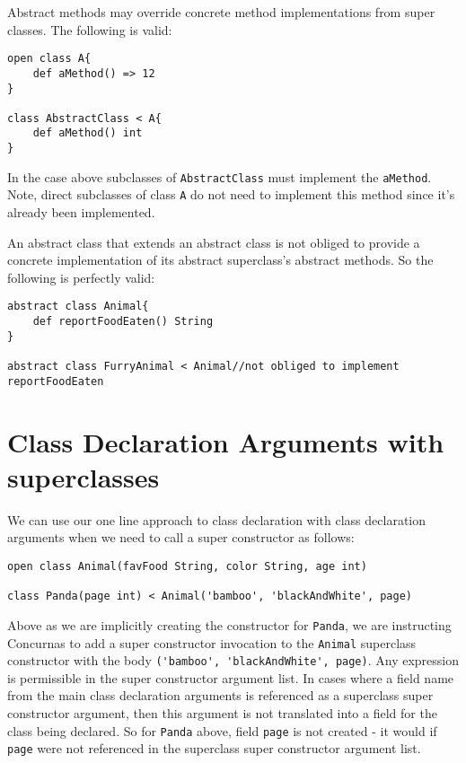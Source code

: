 \documentclass[conc-doc]{subfiles}
\begin{document}
Abstract methods may override concrete method implementations from super classes. The following is valid:

\begin{lstlisting}
open class A{
	def aMethod() => 12
}

class AbstractClass < A{
	def aMethod() int
}
\end{lstlisting}

In the case above subclasses of \lstinline{AbstractClass} must implement the \lstinline{aMethod}. Note, direct subclasses of class \lstinline{A} do not need to implement this method since it's already been implemented.

An abstract class that extends an abstract class is not obliged to provide a concrete implementation of its abstract superclass's abstract methods. So the following is perfectly valid:

\begin{lstlisting}
abstract class Animal{
	def reportFoodEaten() String
}

abstract class FurryAnimal < Animal//not obliged to implement reportFoodEaten
\end{lstlisting}

\section{Class Declaration Arguments with superclasses}
We can use our one line approach to class declaration with class declaration arguments when we need to call a super constructor as follows:

\begin{lstlisting}
open class Animal(favFood String, color String, age int)

class Panda(page int) < Animal('bamboo', 'blackAndWhite', page)
\end{lstlisting}

Above as we are implicitly creating the constructor for \lstinline{Panda}, we are instructing Concurnas to add a super constructor invocation to the \lstinline{Animal} superclass constructor with the body \lstinline{('bamboo', 'blackAndWhite', page)}. Any expression is permissible in the super constructor argument list. In cases where a field name from the main class declaration arguments is referenced as a superclass super constructor argument, then this argument is not translated into a field for the class being declared. So for \lstinline{Panda} above, field \lstinline{page} is not created - it would if \lstinline{page} were not referenced in the superclass super constructor argument list.
\end{document}
